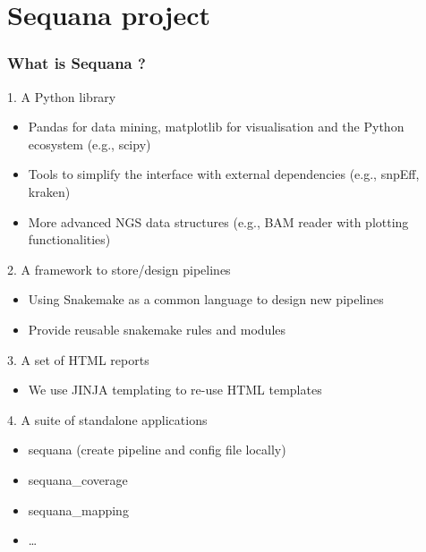 \documentclass{beamer}
\begin{document}
\section{Sequana project}

\begin{frame}
    \frametitle{What is Sequana ?}
    \begin{block}{1. A Python library}
       \tiny
    \begin{itemize}
        \item Pandas for data mining, matplotlib for visualisation and the Python ecosystem (e.g., scipy)
        \item Tools to simplify the interface with external dependencies (e.g., snpEff, kraken)
        \item More advanced NGS data structures (e.g., BAM reader with plotting functionalities)
    \end{itemize} 
    \end{block}
    \pause
    
    \begin{block}{2. A framework to store/design pipelines}
    \tiny
    \begin{itemize}
        \item Using Snakemake as a common language to design new pipelines
        \item Provide reusable snakemake rules and modules
    \end{itemize} 
     \end{block}
  \pause
  
    \begin{block}{3. A set of HTML reports}
    \tiny
    \begin{itemize}
	\item We use JINJA templating to re-use HTML templates
    \end{itemize} 
    \end{block}
  \pause  
    \begin{block}{4. A suite of standalone applications}
    \tiny
    \begin{itemize}
	\item sequana (create pipeline and config file locally)
	\item sequana\_coverage
	\item sequana\_mapping
	\item \dots
    \end{itemize} 
    \end{block}
\end{frame}
\end{document}
